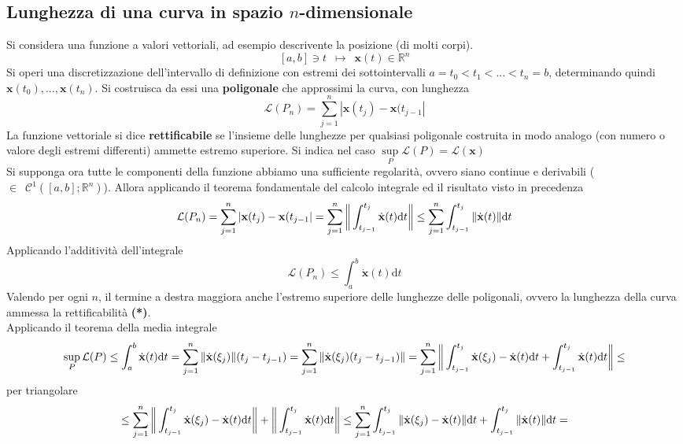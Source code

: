\documentclass[10pt]{article}
\theoremstyle{plain}
\begin{document}
\subsection{Lunghezza di una curva in spazio $n$-dimensionale}
Si considera una funzione a valori vettoriali, ad esempio descrivente la posizione (di molti corpi). \[[a,b] \owns t \enspace \mapsto \enspace \mathbf{x}(t) \in \mathbb{R}^n\]
Si operi una discretizzazione dell'intervallo di definizione con estremi dei sottointervalli $a = t_0 < t_1 < ... < t_n = b$, determinando quindi $\mathbf{x}(t_0), ..., \mathbf{x}(t_n)$. Si costruisca da essi una \textbf{poligonale} che approssimi la curva, con lunghezza
\[\mathcal{L}(P_n) = \sum\limits_{j=1}^n |\mathbf{x}(t_j) - \mathbf{x}(t_{j-1}|\]
La funzione vettoriale si dice \textbf{rettificabile} se l'insieme delle lunghezze per qualsiasi poligonale costruita in modo analogo (con numero o valore degli estremi differenti) ammette estremo superiore. Si indica nel caso $\displaystyle \sup\limits_{P} \mathcal{L}(P) = \mathcal{L}(\mathbf{x})$
\\Si supponga ora tutte le componenti della funzione abbiamo una sufficiente regolarità, ovvero siano continue e derivabili ($\in \enspace \mathcal{C}^{1}([a,b] ; \mathbb{R}^n)$). Allora applicando il teorema fondamentale del calcolo integrale ed il risultato visto in precedenza
\[\mathcal{L}(P_n) = \sum\limits_{j=1}^n |\mathbf{x}(t_j) - \mathbf{x}(t_{j-1}| = \sum\limits_{j=1}^n\bigg{\|}\int_{t_{j-1}}^{t_j}\dot{\mathbf{x}}(t)\textrm{d}t\bigg{\|} \leq \sum\limits_{j=1}^n\int_{t_{j-1}}^{t_j}\|\dot{\mathbf{x}}(t)\|\textrm{d}t\]
Applicando l'additività dell'integrale
\[\mathcal{L}(P_n) \leq \int_{a}^{b}\dot{\mathbf{x}}(t)\textrm{d}t\]
Valendo per ogni $n$, il termine a destra maggiora anche l'estremo superiore delle lunghezze delle poligonali, ovvero la lunghezza della curva ammessa la rettificabilità \textbf{(*)}.
\\Applicando il teorema della media integrale
\[\sup\limits_{P}\mathcal{L}(P) \leq \int_{a}^{b}\dot{\mathbf{x}}(t)\textrm{d}t = \sum\limits_{j=1}^n\|\dot{\mathbf{x}}(\xi_j)\| (t_j - t_{j-1}) = \sum\limits_{j=1}^n\|\dot{\mathbf{x}}(\xi_j) (t_j - t_{j-1})\| = \sum\limits_{j=1}^n \bigg{\|}\int_{t_{j-1}}^{t_j}\dot{\mathbf{x}}(\xi_j) - \dot{\mathbf{x}}(t)\textrm{d}t + \int_{t_{j-1}}^{t_j}\dot{\mathbf{x}}(t)\textrm{d}t\bigg{\|} \leq\]
per triangolare
\[\leq \sum\limits_{j=1}^n \bigg{\|}\int_{t_{j-1}}^{t_j}\dot{\mathbf{x}}(\xi_j) - \dot{\mathbf{x}}(t)\textrm{d}t\bigg{\|} + \bigg{\|}\int_{t_{j-1}}^{t_j}\dot{\mathbf{x}}(t)\textrm{d}t\bigg{\|} \leq \sum\limits_{j=1}^n \int_{t_{j-1}}^{t_j}\|\dot{\mathbf{x}}(\xi_j) - \dot{\mathbf{x}}(t)\|\textrm{d}t + \int_{t_{j-1}}^{t_j}\|\dot{\mathbf{x}}(t)\|\textrm{d}t =\]
\end{document}
